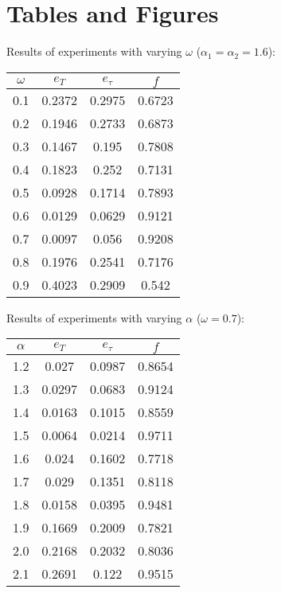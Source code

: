 \documentclass[12pt]{article}
\begin{document}
\appendix
\section{Tables and Figures}
Results of experiments with varying $\omega$ ($\alpha_1=\alpha_2=1.6$):
\begin{center}
 \begin{tabular}{||c c c c||} 
 \hline
 $\omega$ & $e_T$ & $e_\tau$ & $f$ \\ [0.5ex] 
 \hline\hline
 0.1 & 0.2372 & 0.2975 & 0.6723 \\ 
 \hline
 0.2 & 0.1946 & 0.2733 & 0.6873 \\
 \hline
 0.3 & 0.1467 & 0.195 & 0.7808 \\
 \hline
 0.4 & 0.1823 & 0.252 & 0.7131 \\
 \hline
 0.5 & 0.0928 & 0.1714 & 0.7893 \\
 \hline
 0.6 & 0.0129 & 0.0629 & 0.9121 \\
 \hline
 0.7 & 0.0097 & 0.056 & 0.9208 \\
 \hline
 0.8 & 0.1976 & 0.2541 & 0.7176 \\
 \hline
 0.9 & 0.4023 & 0.2909 & 0.542 \\
 \hline
\end{tabular}
\end{center}
Results of experiments with varying $\alpha$ ($\omega=0.7$):
\begin{center}
 \begin{tabular}{||c c c c||} 
 \hline
 $\alpha$ & $e_T$ & $e_\tau$ & $f$ \\ [0.5ex] 
 \hline\hline
 1.2 & 0.027 & 0.0987 & 0.8654 \\ 
 \hline
 1.3 & 0.0297 & 0.0683 & 0.9124 \\
 \hline
 1.4 & 0.0163 & 0.1015 & 0.8559 \\
 \hline
 1.5 & 0.0064 & 0.0214 & 0.9711 \\
 \hline
 1.6 & 0.024 & 0.1602 & 0.7718 \\
 \hline
 1.7 & 0.029 & 0.1351 & 0.8118 \\
 \hline
 1.8 & 0.0158 & 0.0395 & 0.9481 \\
 \hline
 1.9 & 0.1669 & 0.2009 & 0.7821 \\
 \hline
 2.0 & 0.2168 & 0.2032 & 0.8036 \\
 \hline
 2.1 & 0.2691 & 0.122 & 0.9515 \\
 \hline
\end{tabular}
\end{center}
\end{document}
